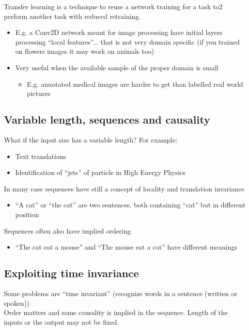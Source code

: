 Transfer learning is a technique to reuse a network training for a task to2 perform another task with reduced retraining.
\begin{itemize}
	\item E.g. a Conv2D network meant for image
	processing have initial layers processing “local
	features”... that is not very domain specific (if
	you trained on flowers images it may work on
	animals too)
	\item Very useful when the available sample of the proper domain is small
	\begin{itemize}
		\item E.g. annotated medical images are
		harder to get than labelled real world
		pictures
	\end{itemize}
\end{itemize}


\subsection{Variable length, sequences and causality}

What if the input size has a variable length? For example:
\begin{itemize}
	\item Text translations
	\item Identification of “jets” of particle in High Energy Physics
\end{itemize}
In many case sequences have still a concept of locality and translation invariance
\begin{itemize}
	\item “A cat” or “the cat” are two sentences, both containing “cat” but in different position
\end{itemize}
Sequences often also have implied ordering
\begin{itemize}
	\item “The cat eat a mouse” and “The mouse eat a cat” have different meanings
\end{itemize}


\subsection{Exploiting time invariance}

Some problems are “time invariant” (recognize words in a sentence (written or spoken))\\
Order matters and some causality is implied in the sequence. Length of the inputs or the output may not be fixed.\\

